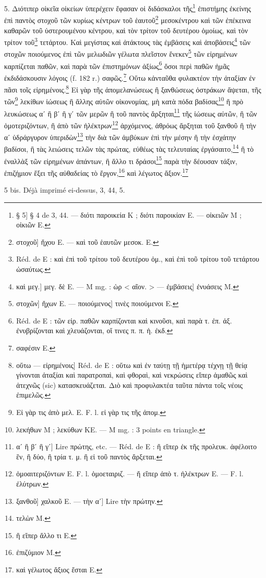 \documentclass[a4paper, 11pt, oneside, polutonikogreek, french]{article}
\begin{document}
5. Διότιπερ οἰκεῖα οἰκείων ὑπερέχειν ἔφασαν οἱ διδάσκαλοι τῆς\footnote{§ 5] § 4 de 3, 44. --- διότι παροικεία Κ ; διότι παροικίαν E. --- οἰκειῶν M ; οἰκιῶν E.} ἐπιστήμης ἐκείνης ἐπὶ παντὸς στοχοῦ τῶν κυρίως κέντρων τοῦ ἑαυτοῦ\footnote{στοχοῦ] ἤχου E. --- καὶ τοῦ ἑαυτῶν μεσοκ. E.} μεσοκέντρου καὶ τῶν ἐπέκεινα καθαρῶν τοῦ ὑστερουμένου κέντρου, καὶ τὸν τρίτον τοῦ δευτέρου ὁμοίως, καὶ τὸν τρίτον τοῦ\footnote{Réd. de E : καὶ ἐπὶ τοῦ τρίτου τοῦ δευτέρου ὁμ., καὶ ἐπὶ τοῦ τρίτου τοῦ τετάρτου ὡσαύτως.} τετάρτου. Καὶ μεγίστας καὶ ἀτάκτους τὰς ἐμβάσεις καὶ ἀποβάσεις\footnote{καὶ μεγ.] μεγ. δὲ E. --- M mg. : ὡρ < αῖον. > --- ἐμβάσεις] ἐνυάσεις M.} τῶν στοχῶν ποιούμενος ἐπὶ τῶν μελωδιῶν γέλωτα πλεῖστον ἕνεκεν\footnote{στοχῶν] ἤχων E. --- ποιούμενος] τινὲς ποιούμενοι E.} τῶν εἰρημένων καρπίζεται παθῶν, καὶ παρὰ τῶν ἐπιστημόνων ἀξίως\footnote{Réd. de E : τῶν εἰρ. παθῶν καρπίζονται καὶ κινοῦσι, καὶ παρὰ τ. ἐπ. ἀξ. ἐνυβρίζονται καὶ χλευάζονται, οἵ τινες π. π. ἡ. ἐκδ.} ὅσοι περὶ παθῶν ἡμᾶς ἐκδιδάσκουσιν λόγοις (f. 182 r.) σαφῶς.\footnote{σαφέσιν E.} Οὕτω κἀνταῦθα φυλακτέον τὴν ἀταξίαν ἐν πᾶσι τοῖς εἰρημένοις.\footnote{οὕτω --- εἰρημένοις] Réd. de E : οὕτω καὶ ἐν ταύτῃ τῇ ἡμετέρᾳ τέχνῃ τῇ θείᾳ γίνονται ἀταξίαι καὶ παρατροπαὶ, καὶ φθοραὶ, καὶ νεκρώσεις εἴπερ ἀμαθῶς καὶ ἀτεχνῶς (sic) κατασκευάζεται. Διὸ καὶ προφυλακτέα ταῦτα πάντα τοῖς νέοις ἐπιμελῶς.} Εἰ γὰρ τῆς ἀπομελανώσεως ἢ ξανθώσεως ὀστράκων ἅψεται, τῆς τῶν\footnote{Εἰ γὰρ τις ἀπὸ μελ. E. F. l. εἰ γὰρ τις τῆς ἀπομ.} λεκίθων ἰώσεως ἢ ἄλλης αὐτῶν οἰκονομίας, μὴ κατὰ πόδα βαδίσας\footnote{λεκήθων M ; λεκύθων KE. --- M mg. : 3 points en triangle.} ἢ πρὸ λευκώσεως αʹ ἢ βʹ ἢ γʹ τῶν μερῶν ἢ τοῦ παντὸς ἄρξηται\footnote{αʹ ἢ βʹ ἢ γʹ] Lire πρώτης, etc. --- Réd. de E : ἢ εἴπερ ἐκ τῆς προλευκ. ἀφέλοιτο ἓν, ἢ δύο, ἢ τρία τ. μ. ἢ εἰ τοῦ παντὸς ἄρξεται.} τῆς ἰώσεως αὐτῶν, ἢ τῶν ὁμοτεριζόντων, ἢ ἀπὸ τῶν ἠλέκτρων\footnote{ὁμοαιτεριζόντων E. F. l. ὁμοεταιριζ. --- ἤ εἴπερ ἀπὸ τ. ἠλέκτρων E. --- F. l. ἐλύτρων.} ἀρχόμενος, ἀθρόως ἄρξηται τοῦ ξανθοῦ ἢ τὴν αʹ ὑδράργυρον ὑπεριδὼν\footnote{ξανθοῦ] χαλκοῦ E. --- τὴν αʹ] Lire τὴν πρώτην.} τὴν διὰ τῶν ἀμβύκων ἐπὶ τὴν μέσην ἢ τὴν ἐσχάτην βαδίσοι, ἢ τὰς λειώσεις τελῶν τὰς πρώτας, εὐθέως τὰς τελευταίας ἐργάσαιτο,\footnote{τελὼν M.} ἢ τὸ ἐναλλὰξ τῶν εἰρημένων ἁπάντων, ἢ ἄλλο τι δράσοι\footnote{ἢ εἴπερ ἄλλο τι E.} παρὰ τὴν δέουσαν τάξιν, ἐπιζήμιον ἕξει τῆς αὐθαδείας τὸ ἔργον,\footnote{ἐπιζύμιον M.} καὶ λέγωτος ἄξιον.\footnote{καὶ γέλωτος ἄξιος ἔσται E.}

5 bis. Déjà imprimé ei-dessus, 3, 44, 5.
\end{document}

